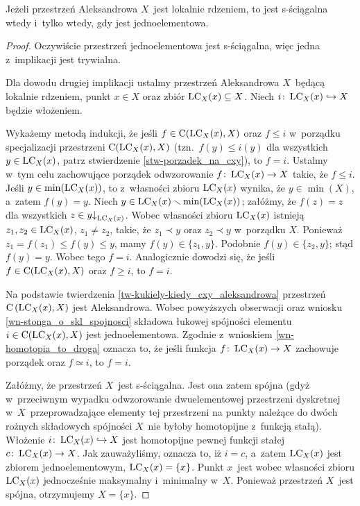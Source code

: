 \begin{stw}\label{stw-rdzen_lokalny_s-sciagalny_to_punkt}
Jeżeli przestrzeń Aleksandrowa $X$~jest lokalnie rdzeniem, to jest s-ściągalna wtedy i~tylko wtedy, gdy jest jednoelementowa.
\end{stw}
\begin{proof}
Oczywiście przestrzeń jednoelementowa jest s-ściągalna, więc jedna z~implikacji jest trywialna.

Dla dowodu drugiej implikacji ustalmy przestrzeń Aleksandrowa $X$~będącą lokalnie rdzeniem, punkt $x\in X$ oraz zbiór $\operatorname{LC}_X(x)\subseteq X$. Niech $i\colon \operatorname{LC}_X(x)\hookrightarrow X$ będzie włożeniem. 

Wykażemy metodą indukcji, że jeśli $f\in \operatorname{C}(\operatorname{LC}_X(x),X)$ oraz $f\leq i$ w~porządku specjalizacji przestrzeni $\operatorname{C}(\operatorname{LC}_X(x),X)$ (tzn.~$f(y)\leq i(y)$ dla wszystkich $y\in \operatorname{LC}_X(x)$, patrz stwierdzenie \ref{stw-porzadek_na_cxy}), to $f=i$. Ustalmy w~tym celu zachowujące porządek odwzorowanie $f\colon \operatorname{LC}_X(x)\to X$ takie, że $f\leq i$. Jeśli $y\in \min(\operatorname{LC}_X(x))$, to z~własności zbioru $\operatorname{LC}_X(x)$ wynika, że $y\in \min(X)$, a~zatem $f(y)=y$. Niech $y\in \operatorname{LC}_X(x)\smallsetminus \min(\operatorname{LC}_X(x))$; załóżmy, że $f(z)=z$ dla wszystkich $z\in y\mathord{\downarrow}_{\operatorname{LC}_X(x)}$. Wobec własności zbioru $\operatorname{LC}_X(x)$ istnieją $z_1,z_2\in\operatorname{LC}_X(x)$, $z_1\not=z_2$, takie, że $z_1\prec y$ oraz $z_2\prec y$ w~porządku $X$. Ponieważ $z_1=f(z_1)\leq f(y)\leq y$, mamy $f(y)\in\{z_1,y\}$. Podobnie $f(y)\in\{z_2,y\}$; stąd $f(y)=y$. Wobec tego $f=i$. Analogicznie dowodzi się, że jeśli $f\in \operatorname{C}(\operatorname{LC}_X(x),X)$ oraz $f\geq i$, to $f=i$.

Na podstawie twierdzenia \ref{tw-kukiely-kiedy_cxy_aleksandrowa} przestrzeń $\operatorname{C}\left(\operatorname{LC}_X(x),X\right)$ jest Aleksandrowa. Wobec powyższych obserwacji oraz wniosku \ref{wn-stonga_o_skl_spojnosci} składowa łukowej spójności elementu $i\in \operatorname{C}(\operatorname{LC}_X(x),X)$ jest jednoelementowa. Zgodnie z~wnioskiem \ref{wn-homotopia_to_droga} oznacza to, że jeśli funkcja $f\colon \operatorname{LC}_X(x) \to X$ zachowuje porządek oraz $f\simeq i$, to $f=i$.

Załóżmy, że przestrzeń $X$~jest s-ściągalna. Jest ona zatem spójna (gdyż w~przeciwnym wypadku odwzorowanie dwuelementowej przestrzeni dyskretnej w~$X$~przeprowadzające elementy tej przestrzeni na punkty należące do dwóch rożnych składowych spójności $X$~nie byłoby homotopijne z~funkcją stałą). Włożenie $i\colon \operatorname{LC}_X(x)\hookrightarrow X$ jest homotopijne pewnej funkcji stałej $c\colon \operatorname{LC}_X(x)\to X$. Jak zauważyliśmy, oznacza to, iż $i=c$, a~zatem $\operatorname{LC}_X(x)$ jest zbiorem jednoelementowym, $\operatorname{LC}_X(x)=\{x\}$. Punkt $x$~jest wobec własności zbioru $\operatorname{LC}_X(x)$ jednocześnie maksymalny i~minimalny w~$X$. Ponieważ przestrzeń $X$~jest spójna, otrzymujemy $X=\{x\}$.
\end{proof}

